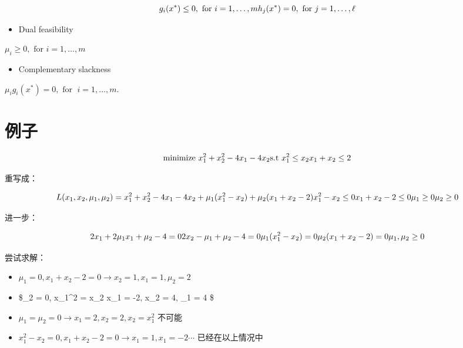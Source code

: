 \documentclass[
]{book}
\providecommand{\tightlist}{%
  \setlength{\itemsep}{0pt}\setlength{\parskip}{0pt}}
\begin{document}
\[
{\displaystyle g_{i}(x^{*})\leq 0,{\text{ for }}i=1,\ldots ,m}\\
{\displaystyle h_{j}(x^{*})=0,{\text{ for }}j=1,\ldots ,\ell \,\!}
\]

\begin{itemize}
\tightlist
\item
  Dual feasibility
\end{itemize}

\({\displaystyle \mu _{i}\geq 0,{\text{ for }}i=1,\ldots ,m}\)

\begin{itemize}
\tightlist
\item
  Complementary slackness
\end{itemize}

\({\displaystyle \mu _{i}g_{i}(x^{*})=0,{\text{ for }}\;i=1,\ldots ,m.}\)

\hypertarget{ux4f8bux5b50-3}{%
\section{例子}\label{ux4f8bux5b50-3}}

\[
\text{minimize } x_1^2 + x_2^2 - 4x_1 - 4x_2 \\
\text{s.t } x_1^2 \le x_2 \\
x_1 + x_2 \le 2
\]

重写成：

\[
L(x_1, x_2, \mu_1, \mu_2) =  x_1^2 + x_2^2 - 4x_1 - 4x_2 + \mu_1(x_1^2 - x_2) + \mu_2( x_1 + x_2 - 2) \\
x_1^2 - x_ 2 \le 0 \\
x_1 + x_2 - 2 \le 0 \\
\mu_1 \ge 0 \\
\mu_2 \ge 0
\]

进一步：

\[
2x_1 + 2\mu_1x_1 + \mu_2 -4 = 0 \\
2x_2 - \mu_1 + \mu_2 - 4 = 0 \\
\mu_1(x_1^2 - x_2) = 0\\
\mu_2(x_1+x_2-2) = 0 \\
\mu_1, \mu_2 \ge 0
\]

尝试求解：

\begin{itemize}
\tightlist
\item
  \(\mu_1 = 0, x_1 + x_2 -2 = 0 \to x_2 = 1, x_1 = 1,\mu_2 = 2\)
\item
  \$\mu\_2 = 0, x\_1\^{}2 = x\_2 \to x\_1 = -2, x\_2 = 4, \mu\_1 = 4 \$
\item
  \(\mu_1 = \mu_2 = 0 \to x_1 = 2, x_2 = 2, x_2 = x_1^2\) 不可能\\
\item
  \(x_1^2 - x_2 = 0, x_1 + x_2 -2 = 0 \to x_1 = 1, x_1 = -2 \cdots\) 已经在以上情况中
\end{itemize}
\end{document}
